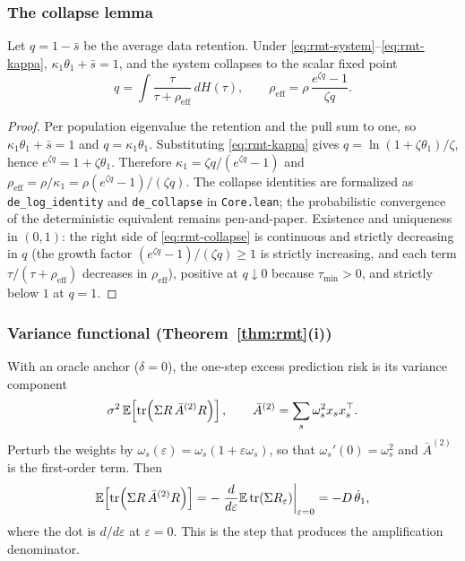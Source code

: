 \subsubsection{The collapse lemma}
\label{app:rmt-collapse}

\begin{lemma}[Collapse]
\label{lem:rmt-collapse}
Let $q = 1 - \bar s$ be the average data retention. Under \eqref{eq:rmt-system}--\eqref{eq:rmt-kappa}, $\kappa_1 \theta_1 + \bar s = 1$, and the system collapses to the scalar fixed point
\begin{equation}
\label{eq:rmt-collapse}
q = \int \frac{\tau}{\tau + \rho_{\mathrm{eff}}}\, dH(\tau),
\qquad
\rho_{\mathrm{eff}} = \rho\,\frac{e^{\zeta q} - 1}{\zeta q}.
\end{equation}
\end{lemma}

\begin{proof}
Per population eigenvalue the retention and the pull sum to one, so $\kappa_1 \theta_1 + \bar s = 1$ and $q = \kappa_1 \theta_1$.
Substituting \eqref{eq:rmt-kappa} gives $q = \ln(1 + \zeta \theta_1)/\zeta$, hence $e^{\zeta q} = 1 + \zeta \theta_1$.
Therefore $\kappa_1 = \zeta q/(e^{\zeta q} - 1)$ and
$\rho_{\mathrm{eff}} = \rho/\kappa_1 = \rho (e^{\zeta q} - 1)/(\zeta q)$.
The collapse identities are formalized as \texttt{de\_log\_identity} and \texttt{de\_collapse} in \texttt{Core.lean}; the probabilistic convergence of the deterministic equivalent remains pen-and-paper.
Existence and uniqueness in $(0,1)$: the right side of \eqref{eq:rmt-collapse} is continuous and strictly decreasing in $q$ (the growth factor $(e^{\zeta q}-1)/(\zeta q) \ge 1$ is strictly increasing, and each term $\tau/(\tau + \rho_{\mathrm{eff}})$ decreases in $\rho_{\mathrm{eff}}$), positive at $q \downarrow 0$ because $\tau_{\min} > 0$, and strictly below $1$ at $q = 1$.
\end{proof}

\subsubsection{Variance functional (Theorem~\ref{thm:rmt}(i))}
\label{app:rmt-variance}

With an oracle anchor ($\delta = 0$), the one-step excess prediction risk is its variance component
\begin{equation}
\label{eq:rmt-variance}
\sigma^2\,\mathbb{E}\!\left[\operatorname{tr}\!\left(\Sigma R\, \bar A^{(2)} R\right)\right],
\qquad
\bar A^{(2)} = \sum_s \omega_s^2 x_s x_s^\top .
\end{equation}
Perturb the weights by $\omega_s(\varepsilon) = \omega_s(1 + \varepsilon \omega_s)$, so that $\omega_s'(0) = \omega_s^2$ and $\bar A^{(2)}$ is the first-order term.
Then
\begin{equation}
\label{eq:rmt-derivative}
\mathbb{E}\!\left[\operatorname{tr}\!\left(\Sigma R\, \bar A^{(2)} R\right)\right]
= -\left.\frac{d}{d\varepsilon}\mathbb{E}\operatorname{tr}\!\left(\Sigma R_\varepsilon\right)\right|_{\varepsilon=0}
= -D\,\dot\theta_1,
\end{equation}
where the dot is $d/d\varepsilon$ at $\varepsilon = 0$.
This is the step that produces the amplification denominator.

